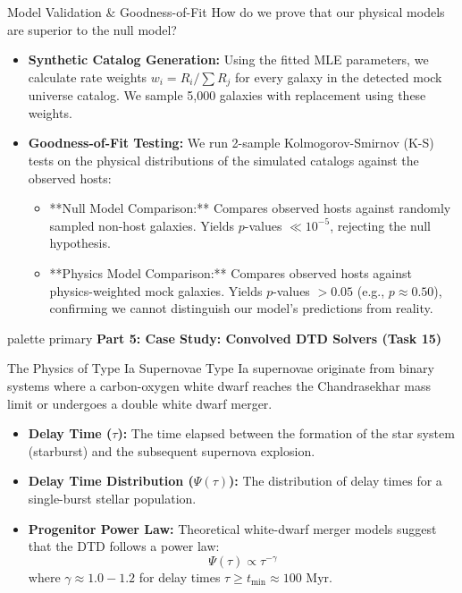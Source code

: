 \documentclass[9pt]{beamer}
\begin{document}
\begin{frame}{Model Validation \& Goodness-of-Fit}
  How do we prove that our physical models are superior to the null model?
  \begin{itemize}
    \item \textbf{Synthetic Catalog Generation:}
      Using the fitted MLE parameters, we calculate rate weights $w_i = R_i / \sum R_j$ for every galaxy in the detected mock universe catalog. We sample 5,000 galaxies with replacement using these weights.
    \item \textbf{Goodness-of-Fit Testing:}
      We run 2-sample Kolmogorov-Smirnov (K-S) tests on the physical distributions of the simulated catalogs against the observed hosts:
      \begin{itemize}
        \item **Null Model Comparison:** Compares observed hosts against randomly sampled non-host galaxies. Yields $p$-values $\ll 10^{-5}$, rejecting the null hypothesis.
        \item **Physics Model Comparison:** Compares observed hosts against physics-weighted mock galaxies. Yields $p$-values $> 0.05$ (e.g., $p \approx 0.50$), confirming we cannot distinguish our model's predictions from reality.
      \end{itemize}
  \end{itemize}
\end{frame}

\begin{frame}[plain]
  \vfill
  \centering
  \begin{beamercolorbox}[sep=8pt,center,shadow=true,rounded=true]{palette primary}
    \textbf{Part 5: Case Study: Convolved DTD Solvers (Task 15)}
  \end{beamercolorbox}
  \vfill
\end{frame}

\begin{frame}{The Physics of Type Ia Supernovae}
  Type Ia supernovae originate from binary systems where a carbon-oxygen white dwarf reaches the Chandrasekhar mass limit or undergoes a double white dwarf merger.
  \begin{itemize}
    \item \textbf{Delay Time ($\tau$):} The time elapsed between the formation of the star system (starburst) and the subsequent supernova explosion.
    \item \textbf{Delay Time Distribution ($\Psi(\tau)$):} The distribution of delay times for a single-burst stellar population.
    \item \textbf{Progenitor Power Law:} Theoretical white-dwarf merger models suggest that the DTD follows a power law:
      $$\Psi(\tau) \propto \tau^{-\gamma}$$
      where $\gamma \approx 1.0 - 1.2$ for delay times $\tau \ge t_{\text{min}} \approx 100\text{ Myr}$.
  \end{itemize}
\end{frame}
\end{document}
